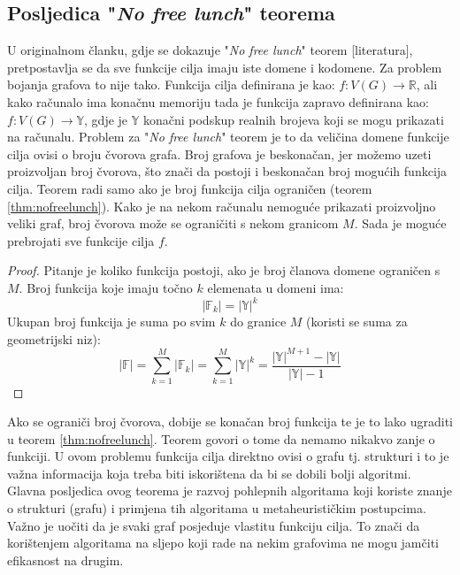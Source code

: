 \documentclass[times, utf8, diplomski, numeric]{fer}
\begin{document}
\subsection{Posljedica "\emph{No free lunch}" teorema}

U originalnom članku, gdje se dokazuje "\emph{No free lunch}" teorem [literatura], pretpostavlja se da sve funkcije cilja imaju iste domene i kodomene. Za problem bojanja grafova to nije tako. Funkcija cilja definirana je kao: $f:V(G) \rightarrow \mathbb{R}$, ali kako računalo ima konačnu memoriju tada je funkcija zapravo definirana kao: $f:V(G) \rightarrow \mathbb{Y}$, gdje je $\mathbb{Y}$ konačni podskup realnih brojeva koji se mogu prikazati na računalu. Problem za "\emph{No free lunch}" teorem je to da veličina domene funkcije cilja ovisi o broju čvorova grafa. Broj grafova je beskonačan, jer možemo uzeti proizvoljan broj čvorova, što znači da postoji i beskonačan broj mogućih funkcija cilja. Teorem radi samo ako je broj funkcija cilja ograničen (teorem \ref{thm:nofreelunch}). Kako je na nekom računalu nemoguće prikazati proizvoljno veliki graf, broj čvorova može se ograničiti s nekom granicom $M$. Sada je moguće prebrojati sve funkcije cilja $f$.

\begin{proof}
Pitanje je koliko funkcija postoji, ako je broj članova domene ograničen s $M$.
Broj funkcija koje imaju točno $k$ elemenata u domeni ima:
	\begin{equation}
		|\mathbb{F}_k| = |\mathbb{Y}|^k
	\end{equation}
Ukupan broj funkcija je suma po svim $k$ do granice $M$ (koristi se suma za geometrijski niz):
	\begin{equation}
		|\mathbb{F}| = \sum_{k=1}^{M}|\mathbb{F}_k| = \sum_{k=1}^{M} |\mathbb{Y}|^k = \frac{|\mathbb{Y}|^{M+1}-|\mathbb{Y}|}{|\mathbb{Y}|-1}
	\end{equation}
\end{proof} 

Ako se ograniči broj čvorova, dobije se konačan broj funkcija te je to lako ugraditi u teorem \ref{thm:nofreelunch}. Teorem govori o tome da nemamo nikakvo zanje o funkciji. U ovom problemu funkcija cilja direktno ovisi o grafu tj. strukturi i to je važna informacija koja treba biti iskorištena da bi se dobili bolji algoritmi. Glavna posljedica ovog teorema je razvoj pohlepnih algoritama koji koriste znanje o strukturi (grafu) i primjena tih algoritama u metaheurističkim postupcima. 
Važno je uočiti da je svaki graf posjeduje vlastitu funkciju cilja. To znači da korištenjem algoritama na sljepo koji rade na nekim grafovima ne mogu jamčiti efikasnost na drugim.
\end{document}
